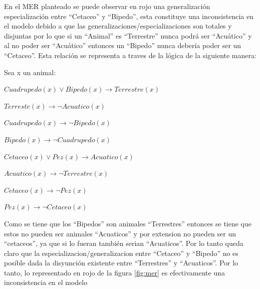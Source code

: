 En el MER planteado se puede observar en rojo una generalización especialización entre ``Cetaceo'' y ``Bipedo'', esta constituye una inconsistencia en el modelo debido a que las generalizaciones/especializaciones son totales y disjuntas por lo que si un ``Animal'' es ``Terrestre'' nunca podrá ser ``Acuático'' y al no poder ser ``Acuático'' entonces un ``Bipedo'' nunca debería poder ser un ``Cetaceo''. Esta relación se representa a traves de la lógica de la siguiente manera:
\begin{tcolorbox}
  Sea x un animal:
  
  \begin{center}
    $Cuadrupedo(x) \lor Bipedo(x) \longrightarrow Terrestre(x)$

    $Terreste(x) \longrightarrow \lnot Acuatico(x) $

    $Cuadrupedo(x) \longrightarrow \lnot Bipedo(x)$

    $Bipedo(x) \longrightarrow \lnot Cuadrupedo(x)$
    
    $Cetaceo(x) \lor Pez(x)\longrightarrow Acuatico(x)$

    $Acuatico(x) \longrightarrow \lnot Terrestre(x) $

    $Cetaceo(x) \longrightarrow \lnot Pez(x)$

    $Pez(x) \longrightarrow \lnot Cetaceo(x)$

  \end{center}
\end{tcolorbox}

Como se tiene que los ``Bipedos'' son animales ``Terrestres'' entonces se tiene que estos no pueden ser animales ``Acuaticos'' y por extension no pueden ser un ``cetaceos'', ya que si lo fueran también serian ``Acuaticos''. Por lo tanto queda claro que la especializacion/generalizacion entre ``Cetaceo'' y ``Bipedo'' no es posible dada la disyunción existente entre ``Terrestres'' y ``Acuaticos''. Por lo tanto, lo representado en rojo de la figura \ref{fig:mer} es efectivamente una inconsistencia en el modelo

